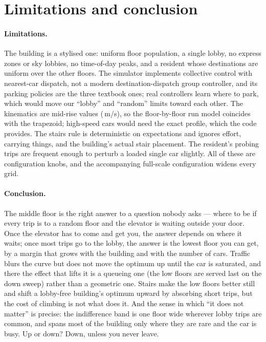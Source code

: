 \section{Limitations and conclusion}
\label{sec:conclusion}

\paragraph{Limitations.} The building is a stylised one: uniform floor
population, a single lobby, no express zones or sky lobbies, no time-of-day
peaks, and a resident whose destinations are uniform over the other floors.
The simulator implements collective control with nearest-car dispatch, not a
modern destination-dispatch group controller, and its parking policies are
the three textbook ones; real controllers learn where to park, which would
move our ``lobby'' and ``random'' limits toward each other. The kinematics are
mid-rise values (\KinV\,m/s), so the floor-by-floor run model coincides with
the trapezoid; high-speed cars would need the exact profile, which the code
provides. The stairs rule is deterministic on expectations and ignores effort,
carrying things, and the building's actual stair placement. The resident's
probing trips are frequent enough to perturb a loaded single car slightly.
All of these are configuration knobs, and the accompanying full-scale
configuration widens every grid.

\paragraph{Conclusion.} The middle floor is the right answer to a question
nobody asks --- where to be if every trip is to a random floor and the
elevator is waiting outside your door. Once the elevator has to come and get
you, the answer depends on where it waits; once most trips go to the lobby,
the answer is the lowest floor you can get, by a margin that grows with the
building and with the number of cars. Traffic blurs the curve but does not
move the optimum up until the car is saturated, and there the effect that
lifts it is a queueing one (the low floors are served last on the down sweep)
rather than a geometric one. Stairs make the low floors better still and shift
a lobby-free building's optimum upward by absorbing short trips, but the
cost of climbing is not what does it. And the sense in which ``it does not
matter'' is precise: the indifference band is one floor wide wherever lobby
trips are common, and spans most of the building only where they are rare
and the car is busy. Up or down? Down, unless you never leave.
